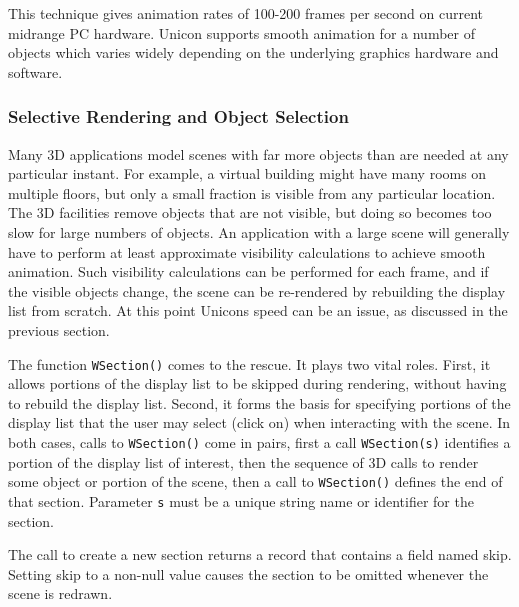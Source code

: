 
This technique gives animation rates of 100-200 frames per second on
current midrange PC hardware. Unicon supports smooth animation for a
number of objects which varies widely depending on the underlying
graphics hardware and software.

\subsubsection{Selective Rendering and Object Selection}

Many 3D applications model scenes with far more objects than are needed
at any particular instant. For example, a virtual building might have
many rooms on multiple floors, but only a small fraction is visible
from any particular location. The 3D facilities remove objects that are
not visible, but doing so becomes too slow for large numbers of
objects. An application with a large scene will generally have to
perform at least approximate visibility calculations to achieve smooth
animation. Such visibility calculations can be performed for each
frame, and if the visible objects change, the scene can be re-rendered
by rebuilding the display list from scratch. At this point
Unicon{\textquotesingle}s speed can be an issue, as discussed in the
previous section.

The function \texttt{WSection()} comes to the rescue. It plays two vital
roles. First, it allows portions of the display list to be skipped
during rendering, without having to rebuild the display list. Second,
it forms the basis for specifying portions of the display list that the
user may select (click on) when interacting with the scene. In both
cases, calls to \texttt{WSection()} come in pairs, first a call
\texttt{WSection(s)} identifies a portion of the display list of
interest, then the sequence of 3D calls to render some object or
portion of the scene, then a call to \texttt{WSection()} defines the
end of that section. Parameter \texttt{s} must be a unique string name
or identifier for the section.

The call to create a new section returns a record that contains a field
named skip. Setting skip to a non-null value causes the section to be
omitted whenever the scene is redrawn.


